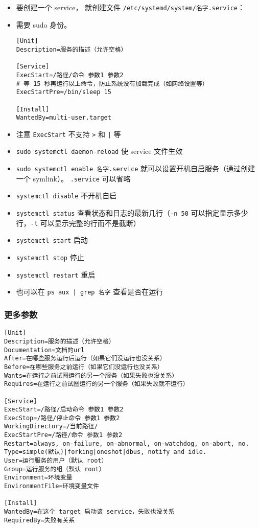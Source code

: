 
\begin{itemize}
\item 要创建一个 service， 就创建文件 \verb`/etc/systemd/system/名字.service`：
\item 需要 sudo 身份。
\begin{lstlisting}[language=none,caption=名字.service]
[Unit]
Description=服务的描述（允许空格）

[Service]
ExecStart=/路径/命令 参数1 参数2
# 等 15 秒再运行以上命令，防止系统没有加载完成（如网络设置等）
ExecStartPre=/bin/sleep 15

[Install]
WantedBy=multi-user.target
\end{lstlisting}
\item 注意 \verb`ExecStart` 不支持 \verb`>` 和 \verb`|` 等
\item \verb`sudo systemctl daemon-reload` 使 service 文件生效
\item \verb`sudo systemctl enable 名字.service` 就可以设置开机自启服务（通过创建一个 symlink）。 \verb`.service` 可以省略
\item \verb`systemctl disable` 不开机自启
\item \verb`systemctl status` 查看状态和日志的最新几行（\verb`-n 50` 可以指定显示多少行，\verb`-l` 可以显示完整的行而不是截断）
\item \verb`systemctl start` 启动
\item \verb`systemctl stop` 停止
\item \verb`systemctl restart` 重启
\item 也可以在 \verb`ps aux | grep 名字` 查看是否在运行
\end{itemize}

\subsubsection{更多参数}
\begin{lstlisting}[language=none,caption=名字.service]
[Unit]
Description=服务的描述（允许空格）
Documentation=文档的url
After=在哪些服务运行后运行（如果它们没运行也没关系）
Before=在哪些服务之前运行（如果它们没运行也没关系）
Wants=在运行之前试图运行的另一个服务（如果失败也没关系）
Requires=在运行之前试图运行的另一个服务（如果失败就不运行）

[Service]
ExecStart=/路径/启动命令 参数1 参数2
ExecStop=/路径/停止命令 参数1 参数2
WorkingDirectory=/当前路径/
ExecStartPre=/路径/命令 参数1 参数2
Restart=always, on-failure, on-abnormal, on-watchdog, on-abort, no.
Type=simple(默认)|forking|oneshot|dbus, notify and idle.
User=运行服务的用户（默认 root）
Group=运行服务的组（默认 root）
Environment=环境变量
EnvironmentFile=环境变量文件

[Install]
WantedBy=在这个 target 启动该 service，失败也没关系
RequiredBy=失败有关系
\end{lstlisting}

